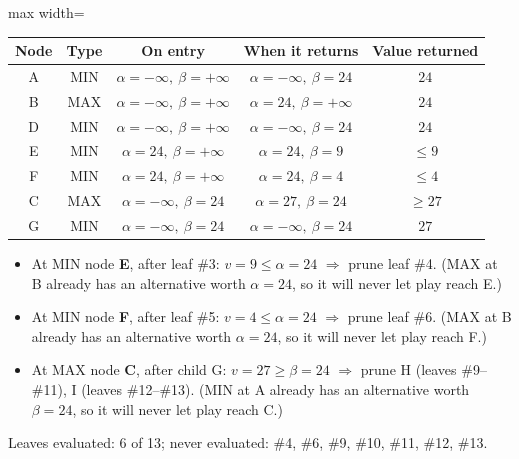 \documentclass[11pt,a4paper]{article}
\begin{document}
\begin{solbox}
\begin{center}
\begin{adjustbox}{max width=\linewidth}
\end{adjustbox}
\end{center}\begin{center}\small\begin{tabular}{c c c c c}\toprule Node & Type & On entry & When it returns & Value returned\\\midrule A & MIN & $\alpha=-\infty,\ \beta=+\infty$ & $\alpha=-\infty,\ \beta=24$ & $24$ \\
B & MAX & $\alpha=-\infty,\ \beta=+\infty$ & $\alpha=24,\ \beta=+\infty$ & $24$ \\
D & MIN & $\alpha=-\infty,\ \beta=+\infty$ & $\alpha=-\infty,\ \beta=24$ & $24$ \\
E & MIN & $\alpha=24,\ \beta=+\infty$ & $\alpha=24,\ \beta=9$ & $\le 9$ \\
F & MIN & $\alpha=24,\ \beta=+\infty$ & $\alpha=24,\ \beta=4$ & $\le 4$ \\
C & MAX & $\alpha=-\infty,\ \beta=24$ & $\alpha=27,\ \beta=24$ & $\ge 27$ \\
G & MIN & $\alpha=-\infty,\ \beta=24$ & $\alpha=-\infty,\ \beta=24$ & $27$ \\\bottomrule\end{tabular}\end{center}\begin{itemize}[leftmargin=1.5em,itemsep=1pt]
\item At MIN node \textbf{E}, after leaf \#3: $v=9 \le \alpha=24$ $\Rightarrow$ prune leaf \#4. (MAX at B already has an alternative worth $\alpha=24$, so it will never let play reach E.)
\item At MIN node \textbf{F}, after leaf \#5: $v=4 \le \alpha=24$ $\Rightarrow$ prune leaf \#6. (MAX at B already has an alternative worth $\alpha=24$, so it will never let play reach F.)
\item At MAX node \textbf{C}, after child G: $v=27 \ge \beta=24$ $\Rightarrow$ prune H (leaves \#9--\#11), I (leaves \#12--\#13). (MIN at A already has an alternative worth $\beta=24$, so it will never let play reach C.)
\end{itemize}Leaves evaluated: 6 of 13; never evaluated: \#4, \#6, \#9, \#10, \#11, \#12, \#13.
\end{solbox}
\end{document}
